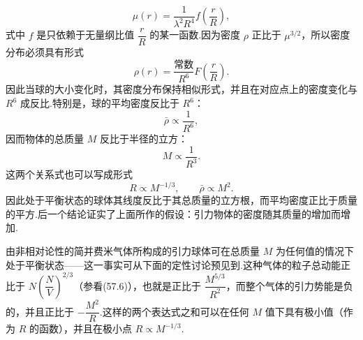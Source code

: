 \begin{equation}
  \mu(r)=\frac{1}{\lambda^2R^4}f\left(\frac rR\right),
\end{equation}
式中 $f$ 是只依赖于无量纲比值 $\dfrac rR$ 的某一函数.因为密度 $\rho$ 正比于 $\mu^{3/2}$，所以密度分布必须具有形式
\begin{equation*}
  \rho(r)=\frac{\text{常数}}{R^6}F\left(\frac rR\right).
\end{equation*}
因此当球的大小变化时，其密度分布保持相似形式，并且在对应点上的密度变化与 $R^6$ 成反比.特别是，球的平均密度反比于 $R^6$：
\begin{equation*}
  \bar{\rho}\propto\frac{1}{R^6},
\end{equation*}
因而物体的总质量 $M$ 反比于半径的立方：
\begin{equation*}
  M\propto\frac{1}{R^3}.
\end{equation*}
这两个关系式也可以写成形式
\begin{equation}
  R\propto M^{-1/3},\qquad\bar{\rho}\propto M^2.
\end{equation}
因此处于平衡状态的球体其线度反比于其总质量的立方根，而平均密度正比于质量的平方.后一个结论证实了上面所作的假设：引力物体的密度随其质量的增加而增加.

由非相对论性的简并费米气体所构成的引力球体可在总质量 $M$ 为任何值的情况下处于平衡状态——这一事实可从下面的定性讨论预见到.这种气体的粒子总动能正比于 $N\left(\dfrac NV\right)^{2/3}$（参看(57.6)），也就是正比于 $\dfrac{M^{5/3}}{R^2}$，而整个气体的引力势能是负的，并且正比于 $-\dfrac{M^2}{R}$.这样的两个表达式之和可以在任何 $M$ 值下具有极小值（作为 $R$ 的函数），并且在极小点 $R\propto M^{-1/3}$.


